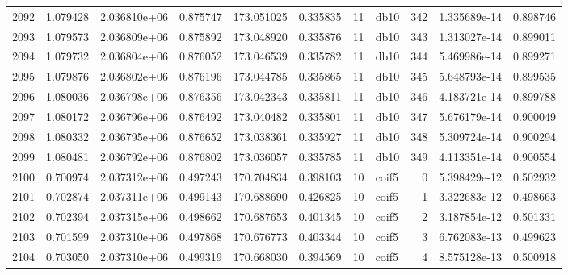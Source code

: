 \begin{tabular}{lrrrrrrlrrr}
2092 &    1.079428 &        2.036810e+06 &  0.875747 &              173.051025 &    0.335835 &      11 &         db10 &    342 &   1.335689e-14 &      0.898746 \\
2093 &    1.079573 &        2.036809e+06 &  0.875892 &              173.048920 &    0.335876 &      11 &         db10 &    343 &   1.313027e-14 &      0.899011 \\
2094 &    1.079732 &        2.036804e+06 &  0.876052 &              173.046539 &    0.335782 &      11 &         db10 &    344 &   5.469986e-14 &      0.899271 \\
2095 &    1.079876 &        2.036802e+06 &  0.876196 &              173.044785 &    0.335865 &      11 &         db10 &    345 &   5.648793e-14 &      0.899535 \\
2096 &    1.080036 &        2.036798e+06 &  0.876356 &              173.042343 &    0.335811 &      11 &         db10 &    346 &   4.183721e-14 &      0.899788 \\
2097 &    1.080172 &        2.036796e+06 &  0.876492 &              173.040482 &    0.335801 &      11 &         db10 &    347 &   5.676179e-14 &      0.900049 \\
2098 &    1.080332 &        2.036795e+06 &  0.876652 &              173.038361 &    0.335927 &      11 &         db10 &    348 &   5.309724e-14 &      0.900294 \\
2099 &    1.080481 &        2.036792e+06 &  0.876802 &              173.036057 &    0.335785 &      11 &         db10 &    349 &   4.113351e-14 &      0.900554 \\
2100 &    0.700974 &        2.037312e+06 &  0.497243 &              170.704834 &    0.398103 &      10 &        coif5 &      0 &   5.398429e-12 &      0.502932 \\
2101 &    0.702874 &        2.037311e+06 &  0.499143 &              170.688690 &    0.426825 &      10 &        coif5 &      1 &   3.322683e-12 &      0.498663 \\
2102 &    0.702394 &        2.037315e+06 &  0.498662 &              170.687653 &    0.401345 &      10 &        coif5 &      2 &   3.187854e-12 &      0.501331 \\
2103 &    0.701599 &        2.037310e+06 &  0.497868 &              170.676773 &    0.403344 &      10 &        coif5 &      3 &   6.762083e-13 &      0.499623 \\
2104 &    0.703050 &        2.037310e+06 &  0.499319 &              170.668030 &    0.394569 &      10 &        coif5 &      4 &   8.575128e-13 &      0.500918 \\

\end{tabular}
